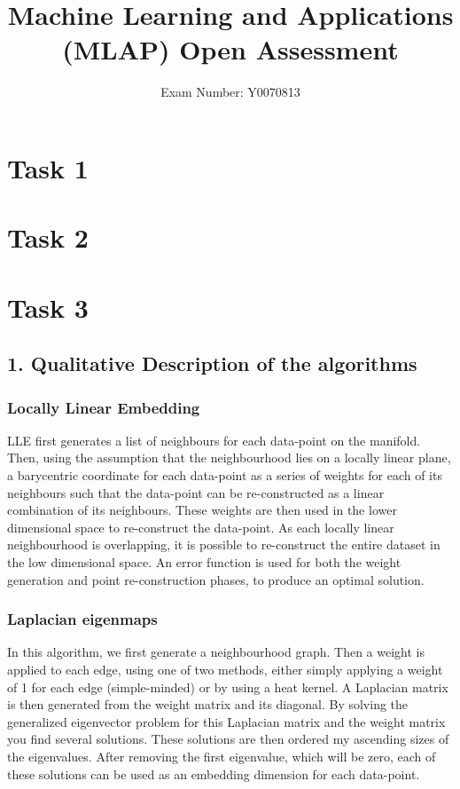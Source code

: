 \documentclass{article}
\begin{document}
\title{Machine Learning and Applications (MLAP) Open Assessment}
\author{Exam Number: Y0070813}
\maketitle
\section{Task 1}
\section{Task 2}
\section{Task 3}
\subsection{1. Qualitative Description of the algorithms}
\subsubsection{Locally Linear Embedding}
LLE first generates a list of neighbours for each data-point on the manifold. Then, using the assumption that the neighbourhood lies on a locally linear plane, a barycentric coordinate for each data-point as a series of weights for each of its neighbours such that the data-point can be re-constructed as a linear combination of its neighbours. These weights are then used in the lower dimensional space to re-construct the data-point. As each locally linear neighbourhood is overlapping, it is possible to re-construct the entire dataset in the low dimensional space. An error function is used for both the weight generation and point re-construction phases, to produce an optimal solution.
\subsubsection{Laplacian eigenmaps}
In this algorithm, we first generate a neighbourhood graph. Then a weight is applied to each edge, using one of two methods, either simply applying a weight of 1 for each edge (simple-minded) or by using a heat kernel. A Laplacian matrix is then generated from the weight matrix and its diagonal. By solving the generalized eigenvector problem for this Laplacian matrix and the weight matrix you find several solutions. These solutions are then ordered my ascending sizes of the eigenvalues. After removing the first eigenvalue, which will be zero, each of these solutions can be used as an embedding dimension for each data-point.
\end{document}
